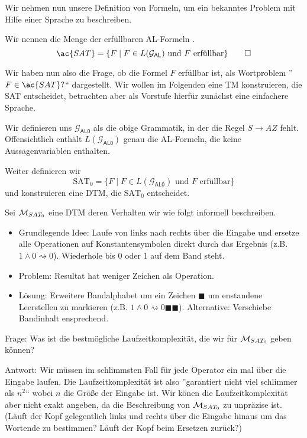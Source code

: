 Wir nehmen nun unsere Definition von Formeln, um ein bekanntes Problem mit Hilfe einer Sprache zu beschreiben.
\begin{Def}
Wir nennen die Menge der erfüllbaren \ac{AL}-Formeln .
\[ \ac{SAT}=\{F\mid F\in L(\mathcal{G}_\mathsf{AL}) \text{ und $F$ erfüllbar}\}\qedhere \]
\end{Def}


Wir haben nun also die Frage, ob die Formel $F$ erfüllbar ist, als Wortproblem ''$F\in \ac{SAT}?$`` dargestellt.
Wir wollen im Folgenden eine \ac{TM} konstruieren, die \ac{SAT} entscheidet, betrachten aber als Vorstufe hierfür zunächst eine einfachere Sprache.


Wir definieren uns $\mathcal{G}_\mathsf{AL0}$ als die obige Grammatik, in der die Regel $S\to AZ$ fehlt.
Offensichtlich enthält $L(\mathcal{G}_\mathsf{AL0})$ genau die \ac{AL}-Formeln, die keine Aussagenvariablen enthalten.

Weiter definieren wir 
$$\text{SAT}_0=\{F\mid F\in L(\mathcal{G}_\mathsf{AL0}) \text{ und $F$ erfüllbar}\}$$
und konstruieren eine \ac{DTM}, die $\text{SAT}_0$ entscheidet.

\begin{Bsp}\label{bsp:DtmSat0}
Sei $\mathcal{M}_{SAT_0}$ eine DTM deren Verhalten wir wie folgt informell beschreiben.
\begin{itemize}
 \item Grundlegende Idee: Laufe von links nach rechts über die Eingabe und ersetze alle Operationen auf Konstantensymbolen direkt durch das Ergebnis (z.B. $1\land 0\rightsquigarrow 0$).
 Wiederhole bis $0$ oder $1$ auf dem Band steht.
 \item Problem: Resultat hat weniger Zeichen als Operation.
 \item Lösung: Erweitere Bandalphabet um ein Zeichen $\blacksquare$ um enstandene Leerstellen zu markieren (z.B. $1\land 0\rightsquigarrow 0\blacksquare\blacksquare$). Alternative: Verschiebe Bandinhalt ensprechend.
\end{itemize}
\end{Bsp}

Frage: Was ist die bestmögliche Laufzeitkomplexität, die wir für $\mathcal{M}_{SAT_0}$ geben können?

Antwort: Wir müssen im schlimmsten Fall für jede Operator ein mal über die Eingabe laufen. 
Die Laufzeitkomplexität ist also ''garantiert nicht viel schlimmer als $n^2$`` wobei $n$ die Größe der Eingabe ist.
Wir könen die Laufzeitkomplexität aber nicht exakt angeben, da die Beschreibung von $\mathcal{M}_{SAT_0}$ zu unpräzise ist.
(Läuft der Kopf gelegentlich links und rechts über die Eingabe hinaus um das Wortende zu bestimmen?
Läuft der Kopf beim Ersetzen zurück?)

